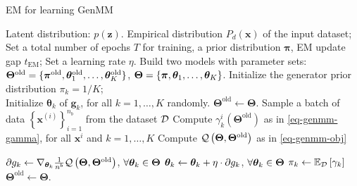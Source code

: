 \begin{algorithm}[t]
  \caption{EM for learning GenMM}\label{flow-algo-em}
  \begin{algorithmic}[1]
    Latent distribution: $p(\bm{z})$. Empirical distribution $P_d(\bm{x})$ of the input dataset;
    \STATE Set a total number of epochs $T$ for training, a prior distribution $\bm{\pi}$, EM update gap $t_{\mathrm{EM}}$;
    \STATE  Set a learning rate $\eta$. 
    \STATE Build two models with parameter sets:
    \STATE ${\bm{\Theta}}^{\mathrm{old}}=\{ \bm{\pi}^{\mathrm{old}},
    \bm{\theta}_1^{\mathrm{old}},\hdots,
    \bm{\theta}_K^{\mathrm{old}} \}$,
    \STATE ${\bm{\Theta}} = \{ \bm{\pi},
    \bm{\theta}_1,\hdots, \bm{\theta}_K \}$.
    \STATE Initialize the generator prior distribution $\pi_k = 1/K$;\\ Initialize $\bm{\theta}_k$ of $\bm{g}_k$, for all $k=1,\dots,K$ randomly. 
    \STATE $\bm{\Theta}^{\mathrm{old}} \gets \bm{\Theta}$.
    \STATE Sample a batch of data $\left\{ \bm{x}^{(i)}
    \right\}_{i=1}^{n_b}$ from the dataset $\mathcal{D}$ 
    \STATE Compute $\gamma_k^{i}(\bm{\Theta}^{\mathrm{old}})$ as in \eqref{eq-genmm-gamma},
    for all $\bm{x}^{i}$ and $k=1, \dots, K$
    \STATE Compute
    $\mathcal{Q}\left(\bm{\Theta},\bm{\Theta}^{\mathrm{old}}\right)$ as in \eqref{eq-genmm-obj}%
    
    \STATE $\partial{g_k} \gets \nabla_{\bm{\theta}_k} \frac{1}{n^{b}}\mathcal{Q}\left(
      \bm{\Theta}, \bm{\Theta}^{\mathrm{old}}\right)$,
    $\forall \bm{\theta}_k \in \bm{\Theta}$
    \STATE $\bm{\theta}_k \gets \bm{\theta}_k + \eta \cdot \partial{g_k}$, $\forall \bm{\theta}_k \in \bm{\Theta}$
    \ENDFOR
    \STATE $\pi_k \gets \mathbb{E}_{\mathcal{D}}\left[ \gamma_k \right]$ %
    \STATE $\bm{\Theta}^{\mathrm{old}} \gets \bm{\Theta}$.
    \ENDIF
    \ENDFOR
  \end{algorithmic}
\end{algorithm}

